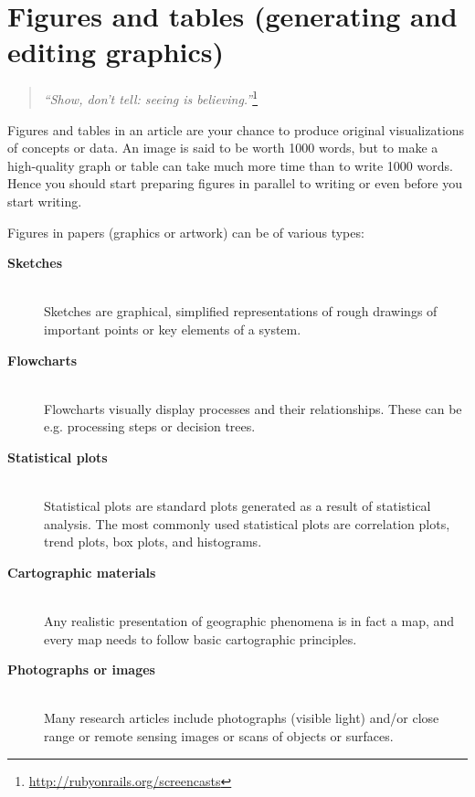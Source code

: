 \documentclass[graybox,envcountchap,sectrefs,UStrade]{svmono}
\begin{document}
\section{Figures and tables (generating and editing graphics)}\label{sec:supergraphics}

\begin{quote}
\emph{``Show, don't tell: seeing is believing.''}\footnote{\url{http://rubyonrails.org/screencasts}}
\end{quote}

Figures and tables in an article are your chance to produce original visualizations of concepts or data. An image is said to be worth 1000 words, but to make a high-quality graph or table can take much more time than to write 1000 words. Hence you should start preparing figures in parallel to writing or even before you start writing.\par

Figures in papers (graphics or artwork) can be of various types:

\begin{description}
  \item[\textbf{Sketches}] \hfill \\
  Sketches are graphical, simplified representations of rough drawings of important points or key elements of a system. \medskip
  \item[\textbf{Flowcharts}] \hfill \\
  Flowcharts visually display processes and their relationships. These can be e.g. processing steps or decision trees. \medskip
  \item[\textbf{Statistical plots}] \hfill \\
  Statistical plots are standard plots generated as a result of statistical analysis. The most commonly used statistical plots are correlation plots, trend plots, box plots, and histograms. \medskip
  \item[\textbf{Cartographic materials}] \hfill \\
  Any realistic presentation of geographic phenomena is in fact a map, and every map needs to follow basic cartographic principles. \medskip
  \item[\textbf{Photographs or images}] \hfill \\
  Many research articles include photographs (visible light) and/or close range or remote sensing images or scans of objects or surfaces.
\end{description}
\end{document}
